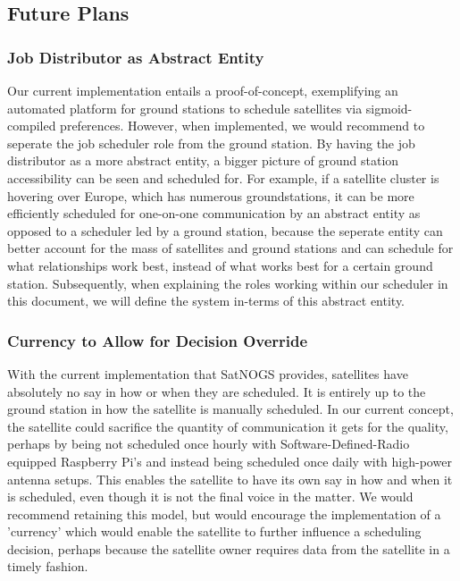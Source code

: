 \documentclass{article}
\begin{document}
\subsection{Future Plans}

\subsubsection{Job Distributor as Abstract Entity}
Our current implementation entails a proof-of-concept, exemplifying an automated platform for ground stations to schedule satellites via sigmoid-compiled preferences. However, when implemented, we would recommend to seperate the job scheduler role from the ground station. By having the job distributor as a more abstract entity, a bigger picture of ground station accessibility can be seen and scheduled for. For example, if a satellite cluster is hovering over Europe, which has numerous groundstations, it can be more efficiently scheduled for one-on-one communication by an abstract entity as opposed to a scheduler led by a ground station, because the seperate entity can better account for the mass of satellites and ground stations and can schedule for what relationships work best, instead of what works best for a certain ground station. Subsequently, when explaining the roles working within our scheduler in this document, we will define the system in-terms of this abstract entity.

\subsubsection{Currency to Allow for Decision Override}
With the current implementation that SatNOGS provides, satellites have absolutely no say in how or when they are scheduled. It is entirely up to the ground station in how the satellite is manually scheduled. In our current concept, the satellite could sacrifice the quantity of communication it gets for the quality, perhaps by being not scheduled once hourly with Software-Defined-Radio equipped Raspberry Pi's and instead being scheduled once daily with high-power antenna setups. This enables the satellite to have its own say in how and when it is scheduled, even though it is not the final voice in the matter. We would recommend retaining this model, but would encourage the implementation of a 'currency' which would enable the satellite to further influence a scheduling decision, perhaps because the satellite owner requires data from the satellite in a timely fashion.
\end{document}

